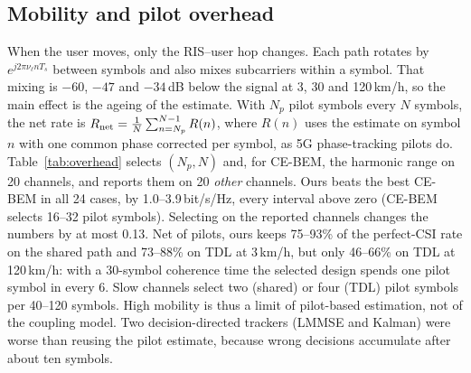 \documentclass[conference,10pt]{IEEEtran}
\theoremstyle{remark}
\begin{document}
\subsection{Mobility and pilot overhead}\label{sec:res-mob}
When the user moves, only the RIS--user hop changes. Each path rotates by $e^{j2\pi\nu_\ell nT_s}$ between symbols and
also mixes subcarriers within a symbol. That mixing is $-60$, $-47$ and $-34$\,dB below the signal at 3, 30 and
120\,km/h, so the main effect is the ageing of the estimate. With $N_p$ pilot symbols every $N$ symbols, the net rate is
$R_{\rm net}=\frac{1}{N}\sum_{n=N_p}^{N-1}R(n)$, where $R(n)$ uses the estimate on symbol $n$ with one common phase
corrected per symbol, as 5G phase-tracking pilots do. Table~\ref{tab:overhead} selects $(N_p,N)$ and, for CE-BEM,
the harmonic range on 20 channels, and reports them on 20 \emph{other} channels. Ours beats the best CE-BEM in all 24
cases, by 1.0--3.9\,bit/s/Hz, every interval above zero (CE-BEM selects 16--32 pilot symbols). Selecting on the
reported channels changes the numbers by at most 0.13. Net of pilots, ours keeps 75--93\% of the perfect-CSI rate on
the shared path and 73--88\% on TDL at 3\,km/h, but only 46--66\% on TDL at 120\,km/h: with a 30-symbol coherence
time the selected design spends one pilot symbol in every 6. Slow channels select two (shared) or four (TDL) pilot
symbols per 40--120 symbols. High mobility is thus a limit of pilot-based estimation, not of the coupling model. Two decision-directed trackers
(LMMSE and Kalman) were worse than reusing the pilot estimate, because wrong decisions accumulate after about ten
symbols.
\end{document}
